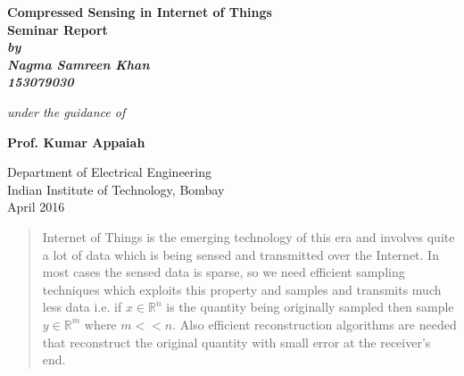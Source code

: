 \documentclass[12pt]{article}
\theoremstyle{definition}
\begin{document}
\begin{titlepage}
\thispagestyle{empty}
\vspace*{0.7cm}
{\centering     
\large
{\Large\bf Compressed Sensing in Internet of Things}\\
\vspace{3cm}
\bf{Seminar Report}\\
\vspace{0.25cm}
\vspace{0.1cm}
\it
by \\
\vspace{.5cm}
\rm
{\large \bf {Nagma Samreen Khan}}\\
{\large \bf {153079030}}

\vspace{1cm}

{\it{under the guidance of}} \\
\vspace{.5cm}

\hspace{.05cm} {\large \bf {Prof. Kumar Appaiah}}\\
\vspace {0.5cm}

\begin{figure}[h] 
{\par}
\end{figure} 

Department of Electrical Engineering \\ 
Indian Institute of Technology, Bombay\\ 
{\centering
\hspace{6.5cm}April 2016} 
}
\pagebreak 
\end{titlepage}

\begin{abstract}
Internet of Things is the emerging technology of this era and involves quite a lot of data which is being 
sensed and transmitted over the Internet.
In most cases the sensed data is sparse, so we need efficient sampling techniques which exploits this property
and samples and transmits much less data i.e. if $x \in \mathbb{R}^n$ is
the quantity being originally sampled then sample $y \in \mathbb{R}^m$ where $m << n$. 
Also efficient reconstruction
algorithms are needed that reconstruct the original quantity with small error at the receiver's end.
\end{abstract}
\end{document}
